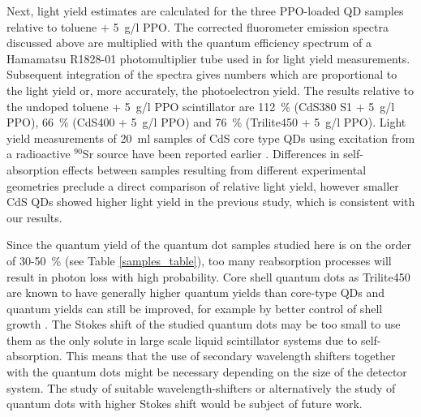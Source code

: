\documentclass[cits]{JINST}
\begin{document}
Next, light yield estimates are calculated for the three PPO-loaded QD samples relative to toluene + 5~g/l PPO. The corrected fluorometer emission spectra discussed above are multiplied with the quantum efficiency spectrum of a Hamamatsu R1828-01 photomultiplier tube used in \cite{mitpaper} for light yield measurements. Subsequent integration of the spectra gives numbers which are proportional to the light yield or, more accurately, the photoelectron yield. The results relative to the undoped toluene + 5~g/l PPO scintillator are 112~\% (CdS380 S1 + 5~g/l PPO), 66~\% (CdS400 + 5~g/l PPO) and 76~\% (Trilite450 + 5~g/l PPO). Light yield measurements of 20~ml samples of CdS core type QDs using excitation from a radioactive $^{90}$Sr source have been reported earlier \cite{mitpaper}. Differences in self-absorption effects between samples resulting from different experimental geometries preclude a direct comparison of relative light yield, however smaller CdS QDs showed higher light yield in the previous study, which is consistent with our results. 
  
Since the quantum yield of the quantum dot samples studied here is on the order of 30-50~\% (see Table \ref{samples_table}), too many reabsorption processes will result in photon loss with high probability. Core shell quantum dots as Trilite450 are known to have generally higher quantum yields than core-type QDs \cite{swafford2006,dabbousi1997,obrien2011} and quantum yields can still be improved, for example by better control of shell growth \cite{mcbride2006}. The Stokes shift of the studied quantum dots may be too small to use them as the only solute in large scale liquid scintillator systems due to self-absorption. This means that the use of secondary wavelength shifters together with the quantum dots might be necessary depending on the size of the detector system. The study of suitable wavelength-shifters or alternatively the study of quantum dots with higher Stokes shift would be subject of future work. 
\end{document}
